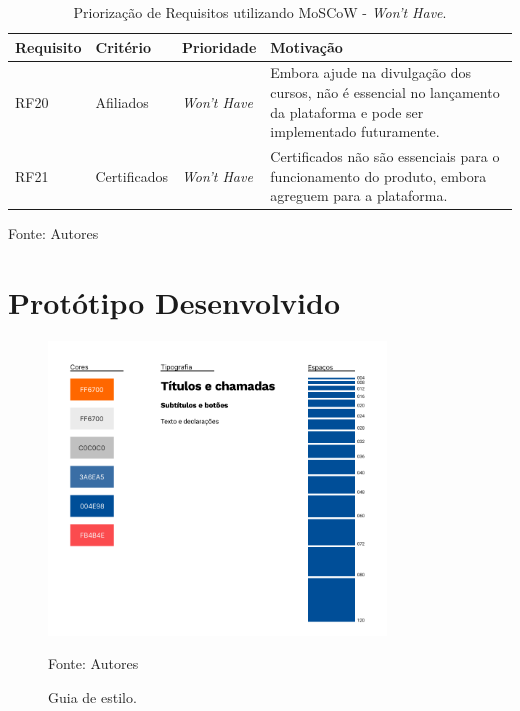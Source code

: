 \begin{apendicesenv}
\begin{table}[h]
    \centering
    \caption{Priorização de Requisitos utilizando MoSCoW - \textit{Won’t Have}.}
    \label{tab:priorizacao_moscow4}
    \begin{adjustbox}{width=\textwidth}
        \begin{tabular}{|p{2.5cm}|p{5cm}|p{5cm}|p{4cm}|}
            \hline
            \textbf{Requisito} & \textbf{Critério} & \textbf{Prioridade} & \textbf{Motivação} \\
            \hline
            RF20 & Afiliados & \textit{Won’t Have} & Embora ajude na divulgação dos cursos, não é essencial no lançamento da plataforma e pode ser implementado futuramente. \\
            \hline
            RF21 & Certificados & \textit{Won’t Have} & Certificados não são essenciais para o funcionamento do produto, embora agreguem para a plataforma. \\
            \hline
        \end{tabular}
    \end{adjustbox}

    \vspace{5mm}
    {\footnotesize Fonte: Autores} 
\end{table}


\chapter{Protótipo Desenvolvido}

    \begin{figure}[h]
        \centering
        \caption{Guia de estilo.}
        \includegraphics[width=0.8\textwidth]{figuras/guia-de-estilo.png}
        \begin{center}
            {\footnotesize Fonte: Autores}
        \end{center}
        \label{fig:guia-de-estilo}
    \end{figure}


\end{apendicesenv}
